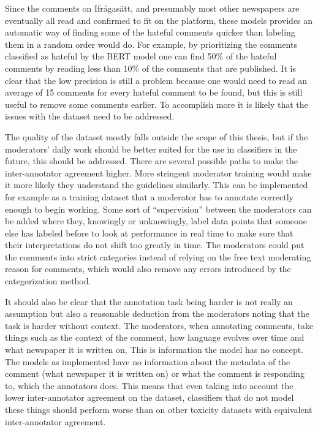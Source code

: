 \documentclass[nofilelist]{cslthse-msc}
\begin{document}
Since the comments on Ifrågasätt, and presumably most other newspapers are eventually all read and confirmed to fit on the platform, these models provides an automatic way of finding some of the hateful comments quicker than labeling them in a random order would do. For example, by prioritizing the comments classified as hateful by the BERT model one can find 50\% of the hateful comments by reading less than 10\% of the comments that are published. It is clear that the low precision is still a problem because one would need to read an average of 15 comments for every hateful comment to be found, but this is still useful to remove some comments earlier. To accomplish more it is likely that the issues with the dataset need to be addressed.

The quality of the dataset mostly falls outside the scope of this thesis, but if the moderators' daily work should be better suited for the use in classifiers in the future, this should be addressed. There are several possible paths to make the inter-annotator agreement higher. More stringent moderator training would make it more likely they understand the guidelines similarly. This can be implemented for example as a training dataset that a moderator has to annotate correctly enough to begin working. Some sort of ``supervision'' between the moderators can be added where they, knowingly or unknowingly, label data points that someone else has labeled before to look at performance in real time to make sure that their interpretations do not shift too greatly in time. The moderators could put the comments into strict categories instead of relying on the free text moderating reason for comments, which would also remove any errors introduced by the categorization method. 

It should also be clear that the annotation task being harder is not really an assumption but also a reasonable deduction from the moderators noting that the task is harder without context. The moderators, when annotating comments, take things such as the context of the comment, how language evolves over time and what newspaper it is written on, This is information the model has no concept. The models as implemented have no information about the metadata of the comment (what newspaper it is written on) or what the comment is responding to, which the annotators does. This means that even taking into account the lower inter-annotator agreement on the dataset, classifiers that do not model these things should perform worse than on other toxicity datasets with equivalent inter-annotator agreement. 
\end{document}
